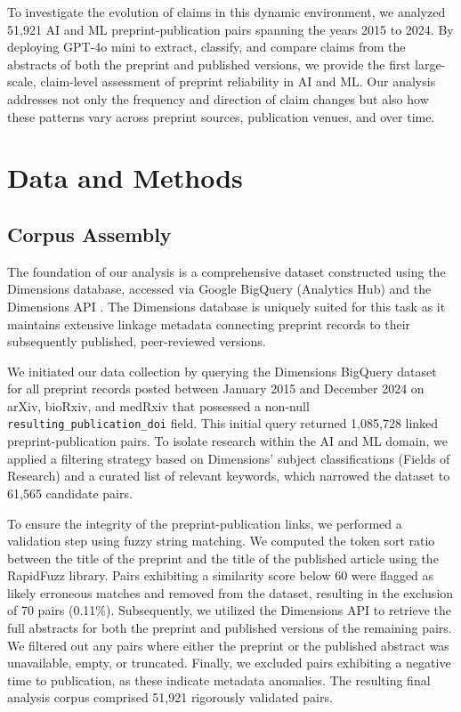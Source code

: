 \documentclass[11pt]{article}
\begin{document}
To investigate the evolution of claims in this dynamic environment, we analyzed 51,921 AI and ML preprint-publication pairs spanning the years 2015 to 2024. By deploying GPT-4o mini to extract, classify, and compare claims from the abstracts of both the preprint and published versions, we provide the first large-scale, claim-level assessment of preprint reliability in AI and ML. Our analysis addresses not only the frequency and direction of claim changes but also how these patterns vary across preprint sources, publication venues, and over time.

\section{Data and Methods}

\subsection{Corpus Assembly}

The foundation of our analysis is a comprehensive dataset constructed using the Dimensions database, accessed via Google BigQuery (Analytics Hub) and the Dimensions API \cite{dimensions2018}. The Dimensions database is uniquely suited for this task as it maintains extensive linkage metadata connecting preprint records to their subsequently published, peer-reviewed versions.

We initiated our data collection by querying the Dimensions BigQuery dataset for all preprint records posted between January 2015 and December 2024 on arXiv, bioRxiv, and medRxiv that possessed a non-null \texttt{resulting\_publication\_doi} field. This initial query returned 1,085,728 linked preprint-publication pairs. To isolate research within the AI and ML domain, we applied a filtering strategy based on Dimensions' subject classifications (Fields of Research) and a curated list of relevant keywords, which narrowed the dataset to 61,565 candidate pairs.

To ensure the integrity of the preprint-publication links, we performed a validation step using fuzzy string matching. We computed the token sort ratio between the title of the preprint and the title of the published article using the RapidFuzz library. Pairs exhibiting a similarity score below 60 were flagged as likely erroneous matches and removed from the dataset, resulting in the exclusion of 70 pairs (0.11\%). Subsequently, we utilized the Dimensions API to retrieve the full abstracts for both the preprint and published versions of the remaining pairs. We filtered out any pairs where either the preprint or the published abstract was unavailable, empty, or truncated. Finally, we excluded pairs exhibiting a negative time to publication, as these indicate metadata anomalies. The resulting final analysis corpus comprised 51,921 rigorously validated pairs.
\end{document}
